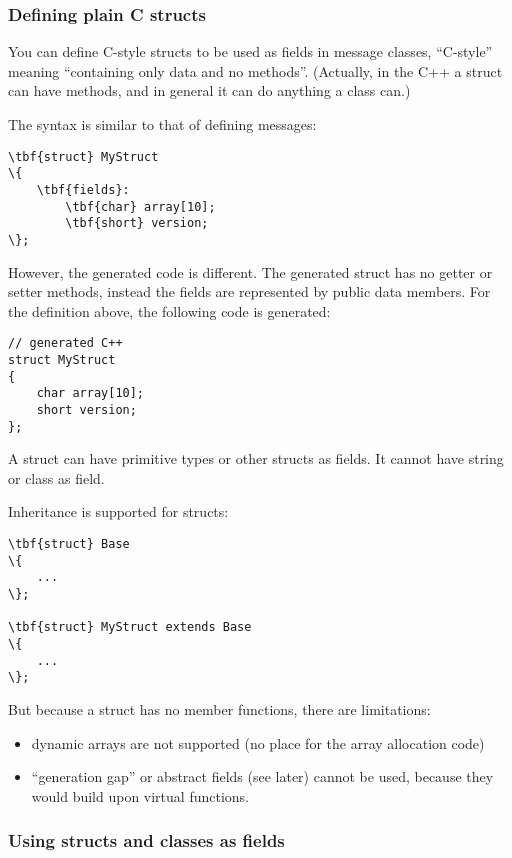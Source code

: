 \subsubsection{Defining plain C structs}

You can define C-style structs to be used as fields in message classes,
``C-style'' meaning ``containing only data and no methods''.
(Actually, in the C++ a struct can have methods,
and in general it can do anything a class can.)

The syntax is similar to that of defining messages:

\begin{Verbatim}[commandchars=\\\{\}]
\tbf{struct} MyStruct
\{
    \tbf{fields}:
        \tbf{char} array[10];
        \tbf{short} version;
\};
\end{Verbatim}

However, the generated code is different. The generated struct has
no getter or setter methods, instead the fields are represented
by public data members. For the definition above, the
following code is generated:

\begin{verbatim}
// generated C++
struct MyStruct
{
    char array[10];
    short version;
};
\end{verbatim}

A struct can have primitive types or other structs as fields. It cannot
have string or class as field.

Inheritance is supported for structs:

\begin{Verbatim}[commandchars=\\\{\}]
\tbf{struct} Base
\{
    ...
\};

\tbf{struct} MyStruct extends Base
\{
    ...
\};
\end{Verbatim}

But because a struct has no member functions, there are limitations:

\begin{itemize}
   \item dynamic arrays are not supported (no place for the array allocation code)
   \item ``generation gap'' or abstract fields (see later) cannot be used,
      because they would build upon virtual functions.
\end{itemize}


\subsubsection{Using structs and classes as fields}

